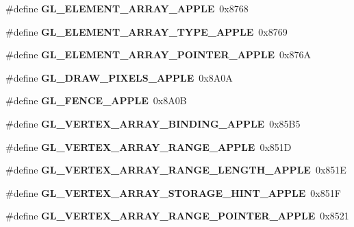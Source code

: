 \begin{DoxyCompactItemize}
\item 
\#define {\bfseries G\+L\+\_\+\+E\+L\+E\+M\+E\+N\+T\+\_\+\+A\+R\+R\+A\+Y\+\_\+\+A\+P\+P\+L\+E}~0x8768\label{_s_d_l__opengl_8h_a7fc353ac3c76d53cb162072300670bea}

\item 
\#define {\bfseries G\+L\+\_\+\+E\+L\+E\+M\+E\+N\+T\+\_\+\+A\+R\+R\+A\+Y\+\_\+\+T\+Y\+P\+E\+\_\+\+A\+P\+P\+L\+E}~0x8769\label{_s_d_l__opengl_8h_a3ce2959fd646905d25c97abd6fb95ed3}

\item 
\#define {\bfseries G\+L\+\_\+\+E\+L\+E\+M\+E\+N\+T\+\_\+\+A\+R\+R\+A\+Y\+\_\+\+P\+O\+I\+N\+T\+E\+R\+\_\+\+A\+P\+P\+L\+E}~0x876\+A\label{_s_d_l__opengl_8h_a77c3712148562c3843a1e1c1f48bce1f}

\item 
\#define {\bfseries G\+L\+\_\+\+D\+R\+A\+W\+\_\+\+P\+I\+X\+E\+L\+S\+\_\+\+A\+P\+P\+L\+E}~0x8\+A0\+A\label{_s_d_l__opengl_8h_aceb9698f0d16cb824b27ccae1fd89708}

\item 
\#define {\bfseries G\+L\+\_\+\+F\+E\+N\+C\+E\+\_\+\+A\+P\+P\+L\+E}~0x8\+A0\+B\label{_s_d_l__opengl_8h_a43f6c8e4fc3dadc613cb9a59cd56954d}

\item 
\#define {\bfseries G\+L\+\_\+\+V\+E\+R\+T\+E\+X\+\_\+\+A\+R\+R\+A\+Y\+\_\+\+B\+I\+N\+D\+I\+N\+G\+\_\+\+A\+P\+P\+L\+E}~0x85\+B5\label{_s_d_l__opengl_8h_a9325608c1db5fdde01919a4a280fb389}

\item 
\#define {\bfseries G\+L\+\_\+\+V\+E\+R\+T\+E\+X\+\_\+\+A\+R\+R\+A\+Y\+\_\+\+R\+A\+N\+G\+E\+\_\+\+A\+P\+P\+L\+E}~0x851\+D\label{_s_d_l__opengl_8h_ad958f6a291e413035af8ff433f4aa3a1}

\item 
\#define {\bfseries G\+L\+\_\+\+V\+E\+R\+T\+E\+X\+\_\+\+A\+R\+R\+A\+Y\+\_\+\+R\+A\+N\+G\+E\+\_\+\+L\+E\+N\+G\+T\+H\+\_\+\+A\+P\+P\+L\+E}~0x851\+E\label{_s_d_l__opengl_8h_a2c169af9ff0bb35239853e216f17d070}

\item 
\#define {\bfseries G\+L\+\_\+\+V\+E\+R\+T\+E\+X\+\_\+\+A\+R\+R\+A\+Y\+\_\+\+S\+T\+O\+R\+A\+G\+E\+\_\+\+H\+I\+N\+T\+\_\+\+A\+P\+P\+L\+E}~0x851\+F\label{_s_d_l__opengl_8h_a46dd6e11e4f816f6218ed0f93221e8fa}

\item 
\#define {\bfseries G\+L\+\_\+\+V\+E\+R\+T\+E\+X\+\_\+\+A\+R\+R\+A\+Y\+\_\+\+R\+A\+N\+G\+E\+\_\+\+P\+O\+I\+N\+T\+E\+R\+\_\+\+A\+P\+P\+L\+E}~0x8521\label{_s_d_l__opengl_8h_a523cca0ad710c291be34e02b09bf6698}


\end{DoxyCompactItemize}
